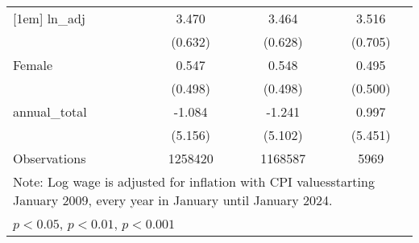 \begin{table}[htbp]
\begin{tabular}{l*{3}{c}}
[1em]
ln\_adj              &       3.470         &       3.464         &       3.516         \\
                    &     (0.632)         &     (0.628)         &     (0.705)         \\
[1em]
Female              &       0.547         &       0.548         &       0.495         \\
                    &     (0.498)         &     (0.498)         &     (0.500)         \\
[1em]
annual\_total        &      -1.084         &      -1.241         &       0.997         \\
                    &     (5.156)         &     (5.102)         &     (5.451)         \\
\hline
Observations        &     1258420         &     1168587         &        5969         \\
\hline\hline
\multicolumn{4}{l}{\footnotesize Note: Log wage is adjusted for inflation with CPI valuesstarting January 2009, every year in January until January 2024.}\\
\multicolumn{4}{l}{\footnotesize \sym{*} \(p<0.05\), \sym{**} \(p<0.01\), \sym{***} \(p<0.001\)}\\
\end{tabular}
\end{table}
